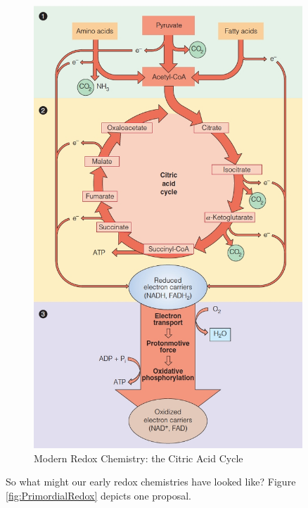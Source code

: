 \documentclass[]{article}
\begin{document}
\begin{figure}[H]
	\caption{Modern Redox Chemistry: the Citric Acid Cycle} \label{fig:ModernRedox} 
	\includegraphics[width=0.9\textwidth]{ModernRedox}
\end{figure}

So what might our early redox chemistries have looked like? Figure \ref{fig:PrimordialRedox} \cite{sojo2016origin} depicts one proposal.
\end{document}
